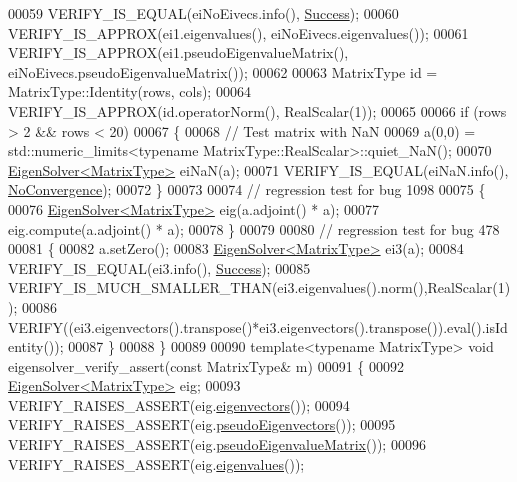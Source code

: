 \begin{DoxyCode}
00059   VERIFY\_IS\_EQUAL(eiNoEivecs.info(), \hyperlink{group__enums_gga85fad7b87587764e5cf6b513a9e0ee5ea52581b035f4b59c203b8ff999ef5fcea}{Success});
00060   VERIFY\_IS\_APPROX(ei1.eigenvalues(), eiNoEivecs.eigenvalues());
00061   VERIFY\_IS\_APPROX(ei1.pseudoEigenvalueMatrix(), eiNoEivecs.pseudoEigenvalueMatrix());
00062 
00063   MatrixType \textcolor{keywordtype}{id} = MatrixType::Identity(rows, cols);
00064   VERIFY\_IS\_APPROX(\textcolor{keywordtype}{id}.operatorNorm(), RealScalar(1));
00065 
00066   \textcolor{keywordflow}{if} (rows > 2 && rows < 20)
00067   \{
00068     \textcolor{comment}{// Test matrix with NaN}
00069     a(0,0) = std::numeric\_limits<typename MatrixType::RealScalar>::quiet\_NaN();
00070     \hyperlink{group___eigenvalues___module_class_eigen_1_1_eigen_solver}{EigenSolver<MatrixType>} eiNaN(a);
00071     VERIFY\_IS\_EQUAL(eiNaN.info(), \hyperlink{group__enums_gga85fad7b87587764e5cf6b513a9e0ee5eaba1c8763d1179778070f365ecc4157a8}{NoConvergence});
00072   \}
00073 
00074   \textcolor{comment}{// regression test for bug 1098}
00075   \{
00076     \hyperlink{group___eigenvalues___module_class_eigen_1_1_eigen_solver}{EigenSolver<MatrixType>} eig(a.adjoint() * a);
00077     eig.compute(a.adjoint() * a);
00078   \}
00079 
00080   \textcolor{comment}{// regression test for bug 478}
00081   \{
00082     a.setZero();
00083     \hyperlink{group___eigenvalues___module_class_eigen_1_1_eigen_solver}{EigenSolver<MatrixType>} ei3(a);
00084     VERIFY\_IS\_EQUAL(ei3.info(), \hyperlink{group__enums_gga85fad7b87587764e5cf6b513a9e0ee5ea52581b035f4b59c203b8ff999ef5fcea}{Success});
00085     VERIFY\_IS\_MUCH\_SMALLER\_THAN(ei3.eigenvalues().norm(),RealScalar(1));
00086     VERIFY((ei3.eigenvectors().transpose()*ei3.eigenvectors().transpose()).eval().isIdentity());
00087   \}
00088 \}
00089 
00090 \textcolor{keyword}{template}<\textcolor{keyword}{typename} MatrixType> \textcolor{keywordtype}{void} eigensolver\_verify\_assert(\textcolor{keyword}{const} MatrixType& m)
00091 \{
00092   \hyperlink{group___eigenvalues___module_class_eigen_1_1_eigen_solver}{EigenSolver<MatrixType>} eig;
00093   VERIFY\_RAISES\_ASSERT(eig.\hyperlink{group___eigenvalues___module_a66288022802172e3ee059283b26201d7}{eigenvectors}());
00094   VERIFY\_RAISES\_ASSERT(eig.\hyperlink{group___eigenvalues___module_a4e796226f06e1f7347cf03a38755a155}{pseudoEigenvectors}());
00095   VERIFY\_RAISES\_ASSERT(eig.\hyperlink{group___eigenvalues___module_a4979eafe0aeef06b19ada7fa5e19db17}{pseudoEigenvalueMatrix}());
00096   VERIFY\_RAISES\_ASSERT(eig.\hyperlink{group___eigenvalues___module_a114189009e42f5e03372a7a3dfa33b97}{eigenvalues}());

\end{DoxyCode}
